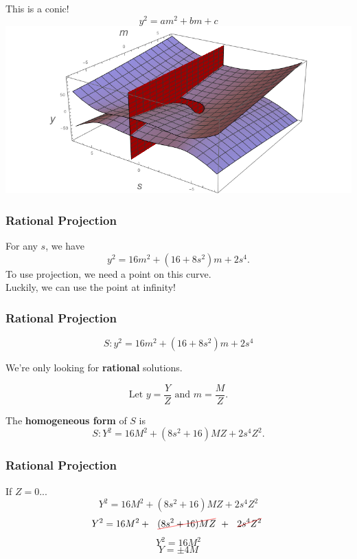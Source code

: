 \begin{frame}[allowframebreaks]
	This is a conic! $$y^2 = am^2 + bm + c$$
	\phantom{hi}
	\includegraphics[width=\textwidth]{CSPlot.png}
\end{frame}

\begin{frame}
	\frametitle{Rational Projection}
	For any $s$, we have
	$$y^2 = 16m^2 + (16+8s^2)m + 2s^4.$$
	\pause
	To use projection, we need a point on this curve.\\
	\pause
	Luckily, we can use the point at infinity!
\end{frame}
	
\begin{frame}
	\frametitle{Rational Projection}
	$$S: y^2 = 16m^2 + (16+8s^2)m + 2s^4$$
	\pause
	\begin{obs}
		We're only looking for \textbf{rational} solutions.
	\end{obs}
	\pause
	$$\mbox{Let }y = \frac{Y}{Z}\mbox{ and }m = \frac{M}{Z}.$$
	\pause
	\begin{defn}
		The \textbf{homogeneous form} of $S$ is
		$$S: Y^2 = 16 M^2 + (8 s^2 + 16) M Z + 2 s^4 Z^2.$$
	\end{defn}
\end{frame}

\begin{frame}
	\frametitle{Rational Projection}
	If $Z=0$...
	\pause
	$$Y^2 = 16 M^2 + (8 s^2 + 16) M Z + 2 s^4 Z^2$$
	\pause
	$$Y^2 = 16 M^2 +\text{ \hcancel{\ensuremath{(8 s^2 + 16) M Z}}} + \text{ \hcancel{\ensuremath{2 s^4 Z^2}}}$$
	\pause
	$$ Y^2 = 16 M^2 $$
	\pause
	$$ Y=\pm 4 M$$
\end{frame}


